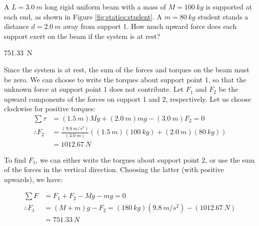 %
%
\question A $L=\SI{3.0}{m}$ long rigid uniform beam with a mass of $M=\SI{100}{kg}$ is supported at each end, as shown in Figure \ref{fig:statics:student}. A $m=\SI{80}{kg}$ student stands a distance $d=\SI{2.0}{m}$ away from support 1. How much upward force does each support exert on the beam if the system is at rest?

\begin{finalanswer}
\SI{751.33}{N}
\end{finalanswer}
\begin{solution} 
Since the system is at rest, the sum of the forces and torques on the beam must be zero. We can choose to write the torques about support point 1, so that the unknown force at support point 1 does not contribute. Let $F_1$ and $F_2$ be the upward components of the forces on support 1 and 2, respectively. Let us choose clockwise for positive torques:
\begin{align*}
\sum \tau &= (\SI{1.5}{m})Mg+(\SI{2.0}{m})mg-(\SI{3.0}{m})F_2=0\\
\therefore F_2& = \frac{(\SI{9.8}{m/s^2})}{(\SI{3.0}{m})}((\SI{1.5}{m})(\SI{100}{kg})+(\SI{2.0}{m})(\SI{80}{kg}))\\
&=\SI{1012.67}{N}
\end{align*}

To find $F_1$, we can either write the torgues about support point 2, or use the sum of the forces in the vertical direction. Choosing the latter (with positive upwards), we have:

\begin{align*}
\sum F &= F_1+F_2-Mg-mg=0\\
\therefore F_1&=(M+m)g-F_2=(\SI{180}{kg})(\SI{9.8}{m/s^2})-(\SI{1012.67}{N})\\
&=\SI{751.33}{N}
\end{align*}
\end{solution}

